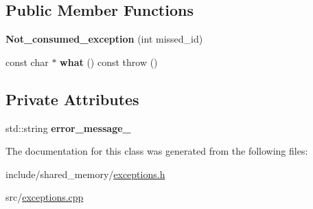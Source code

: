 \subsection*{Public Member Functions}
\begin{DoxyCompactItemize}
\item 
\mbox{\label{classshared__memory_1_1Not__consumed__exception_a10634d3dd5cb672f549205540fdd26a7}} 
{\bfseries Not\+\_\+consumed\+\_\+exception} (int missed\+\_\+id)
\item 
\mbox{\label{classshared__memory_1_1Not__consumed__exception_ae0055624cadbf945771291d61e5cb8a9}} 
const char $\ast$ {\bfseries what} () const  throw ()
\end{DoxyCompactItemize}
\subsection*{Private Attributes}
\begin{DoxyCompactItemize}
\item 
\mbox{\label{classshared__memory_1_1Not__consumed__exception_af35506334fcf23eae0ccfe101a2fdb9c}} 
std\+::string {\bfseries error\+\_\+message\+\_\+}
\end{DoxyCompactItemize}


The documentation for this class was generated from the following files\+:\begin{DoxyCompactItemize}
\item 
include/shared\+\_\+memory/\hyperlink{exceptions_8h}{exceptions.\+h}\item 
src/\hyperlink{exceptions_8cpp}{exceptions.\+cpp}\end{DoxyCompactItemize}
